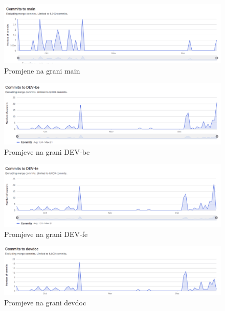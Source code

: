 		\begin{figure}[H]
			\includegraphics[scale=0.4]{slike/main.png} 
			\centering
			\caption{Promjene na grani main}
			\label{fig:promjene}
		\end{figure}
		
		\begin{figure}[H]
			\includegraphics[scale=0.4]{slike/be.png} 
			\centering
			\caption{Promjeve na grani DEV-be}
			\label{fig:promjene}
		\end{figure}
		
		\begin{figure}[H]
			\includegraphics[scale=0.4]{slike/fe.png} 
			\centering
			\caption{Promjeve na grani DEV-fe}
			\label{fig:promjene}
		\end{figure}
		
		\begin{figure}[H]
			\includegraphics[scale=0.4]{slike/doc.png} 
			\centering
			\caption{Promjeve na grani devdoc}
			\label{fig:promjene}
		\end{figure}
		
	
